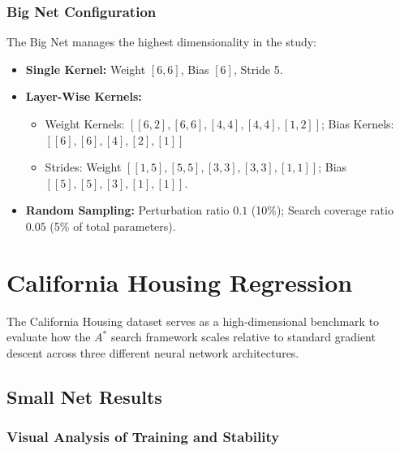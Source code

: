 \subsubsection{Big Net Configuration}
The Big Net manages the highest dimensionality in the study:
\begin{itemize}
    \item \textbf{Single Kernel:} Weight $[6,6]$, Bias $[6]$, Stride 5.
    \item \textbf{Layer-Wise Kernels:} 
        \begin{itemize}
            \item Weight Kernels: $[[6,2], [6,6], [4,4], [4,4], [1,2]]$; Bias Kernels: $[[6], [6], [4], [2], [1]]$
            \item Strides: Weight $[[1,5], [5,5], [3,3], [3,3], [1,1]]$; Bias $[[5], [5], [3], [1], [1]]$.
        \end{itemize}
    \item \textbf{Random Sampling:} Perturbation ratio $0.1$ (10\%); Search coverage ratio $0.05$ (5\% of total parameters).
\end{itemize}



\newpage

\section{California Housing Regression}
\label{sec:results_california}

The California Housing dataset serves as a high-dimensional benchmark to evaluate how the $A^*$ search framework scales relative to standard gradient descent across three different neural network architectures.

\subsection{Small Net Results}

\subsubsection{Visual Analysis of Training and Stability}

